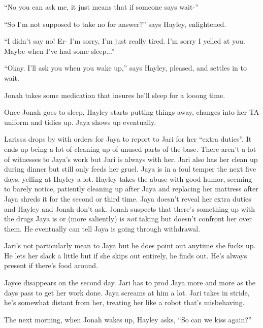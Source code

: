 ``No you can ask me, it just means that if someone says wait-''

``So I'm not supposed to take no for answer?'' says Hayley, enlightened.

``I didn't say no!  Er- I'm sorry, I'm just really tired.  I'm sorry I yelled at you.  Maybe when I've had some sleep...''

``Okay.  I'll ask you when you wake up,'' says Hayley, pleased, and settles in to wait.

Jonah takes some medication that insures he'll sleep for a looong time.



Once Jonah goes to sleep, Hayley starts putting things away, changes into her TA uniform and tidies up.  Jaya shows up eventually.





Larissa drops by with orders for Jaya to report to Jari for her ``extra duties''.  It ends up being a lot of cleaning up of unused parts of the base.  There aren't a lot of witnesses to Jaya's work but Jari is always with her.  Jari also has her clean up during dinner but still only feeds her gruel.  Jaya is in a foul temper the next five days, yelling at Hayley a lot.  Hayley takes the abuse with good humor, seeming to barely notice, patiently cleaning up after Jaya and replacing her mattress after Jaya shreds it for the second or third time.  Jaya doesn't reveal her extra duties and Hayley and Jonah don't ask.  Jonah suspects that there's something up with the drugs Jaya is or (more saliently) is \textit{not} taking but doesn't confront her over them. He eventually can tell Jaya is going through withdrawal.



Jari's not particularly mean to Jaya but he does point out anytime she fucks up.  He lets her slack a little but if she skips out entirely, he finds out.  He's always present if there's food around.



Jayce disappears on the second day.  Jari has to prod Jaya more and more as the days pass to get her work done.  Jaya screams at him a lot.  Jari takes in stride, he's somewhat distant from her, treating her like a robot that's misbehaving.





The next morning, when Jonah wakes up, Hayley asks, ``So can we kiss again?''

